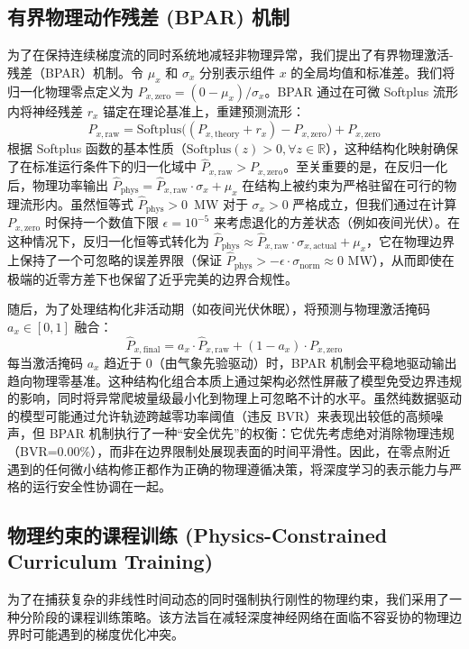 \subsection{有界物理动作残差 (BPAR) 机制} \label{subsec:bpar}
为了在保持连续梯度流的同时系统地减轻非物理异常，我们提出了有界物理激活-残差（BPAR）机制。令 $\mu_x$ 和 $\sigma_x$ 分别表示组件 $x$ 的全局均值和标准差。我们将归一化物理零点定义为 $P_{x,\text{zero}} = (0 - \mu_x) / \sigma_x$。BPAR 通过在可微 Softplus 流形内将神经残差 $r_x$ 锚定在理论基准上，重建预测流形：
\begin{equation}
    \hat{P}_{x,\text{raw}} = \text{Softplus}\Big((P_{x,\text{theory}} + r_x) - P_{x,\text{zero}}\Big) + P_{x,\text{zero}}
\label{eq:bpar}
\end{equation}
根据 Softplus 函数的基本性质（$\text{Softplus}(z) > 0, \forall z \in \mathbb{R}$），这种结构化映射确保了在标准运行条件下的归一化域中 $\hat{P}_{x,\text{raw}} > P_{x,\text{zero}}$。至关重要的是，在反归一化后，物理功率输出 $\hat{P}_{\text{phys}} = \hat{P}_{x,\text{raw}} \cdot \sigma_x + \mu_x$ 在结构上被约束为严格驻留在可行的物理流形内。虽然恒等式 $\hat{P}_{\text{phys}} > 0$~MW 对于 $\sigma_x > 0$ 严格成立，但我们通过在计算 $P_{x,\text{zero}}$ 时保持一个数值下限 $\epsilon=10^{-5}$ 来考虑退化的方差状态（例如夜间光伏）。在这种情况下，反归一化恒等式转化为 $\hat{P}_{\text{phys}} \approx \hat{P}_{x,\text{raw}} \cdot \sigma_{x,\text{actual}} + \mu_x$，它在物理边界上保持了一个可忽略的误差界限（保证 $\hat{P}_{\text{phys}} > - \epsilon \cdot \sigma_{\text{norm}} \approx 0$ MW），从而即使在极端的近零方差下也保留了近乎完美的边界合规性。

随后，为了处理结构化非活动期（如夜间光伏休眠），将预测与物理激活掩码 $a_x \in [0, 1]$ 融合：
\begin{equation}
    \hat{P}_{x,\text{final}} = a_x \cdot \hat{P}_{x,\text{raw}} + (1 - a_x) \cdot P_{x,\text{zero}}
\label{eq:activity_mask}
\end{equation}
每当激活掩码 $a_x$ 趋近于 0（由气象先验驱动）时，BPAR 机制会平稳地驱动输出趋向物理零基准。这种结构化组合本质上通过架构必然性屏蔽了模型免受边界违规的影响，同时将异常爬坡量级最小化到物理上可忽略不计的水平。虽然纯数据驱动的模型可能通过允许轨迹跨越零功率阈值（违反 BVR）来表现出较低的高频噪声，但 BPAR 机制执行了一种“安全优先”的权衡：它优先考虑绝对消除物理违规（BVR=0.00\%），而非在边界限制处展现表面的时间平滑性。因此，在零点附近遇到的任何微小结构修正都作为正确的物理遵循决策，将深度学习的表示能力与严格的运行安全性协调在一起。

\subsection{物理约束的课程训练 (Physics-Constrained Curriculum Training)}
为了在捕获复杂的非线性时间动态的同时强制执行刚性的物理约束，我们采用了一种分阶段的课程训练策略。该方法旨在减轻深度神经网络在面临不容妥协的物理边界时可能遇到的梯度优化冲突。

